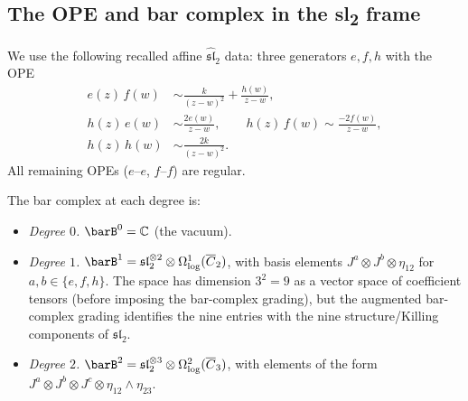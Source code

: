 \subsection{\texorpdfstring{The OPE and bar complex in the sl\textsubscript{2} frame}{The OPE and bar complex in the sl2 frame}}
\label{subsec:rosetta-sl2-bar}

\begin{definition}
\label{def:rosetta-sl2-ope-data}
We use the following recalled affine
$\widehat{\mathfrak{sl}}_2$ data: three generators $e, f, h$ with
the OPE
\begin{align}
e(z)\,f(w) &\sim \frac{k}{(z-w)^2} + \frac{h(w)}{z-w},
 \label{eq:rosetta-ef}\\
h(z)\,e(w) &\sim \frac{2e(w)}{z-w}, \qquad
h(z)\,f(w) \sim \frac{-2f(w)}{z-w},
 \label{eq:rosetta-he-hf}\\
h(z)\,h(w) &\sim \frac{2k}{(z-w)^2}.
 \label{eq:rosetta-hh}
\end{align}
All remaining OPEs ($e$--$e$, $f$--$f$) are regular.
\end{definition}

The bar complex at each degree is:
\begin{itemize}
\item \emph{Degree $0$.}
 $\barB^0 = \mathbb{C}$ (the vacuum).

\item \emph{Degree $1$.}
 $\barB^1 = \mathfrak{sl}_2^{\otimes 2} \otimes
 \Omega^1_{\log}(\overline{C}_2)$, with basis elements
 $J^a \otimes J^b \otimes \eta_{12}$ for $a, b \in \{e, f, h\}$.
 The space has dimension $3^2 = 9$ as a vector space of coefficient
 tensors (before imposing the bar-complex grading), but the augmented
 bar-complex grading identifies the nine entries with the
 nine structure/Killing components of $\mathfrak{sl}_2$.

\item \emph{Degree $2$.}
 $\barB^2 = \mathfrak{sl}_2^{\otimes 3} \otimes
 \Omega^2_{\log}(\overline{C}_3)$, with elements of the form
 $J^a \otimes J^b \otimes J^c \otimes \eta_{12} \wedge \eta_{23}$.
\end{itemize}

